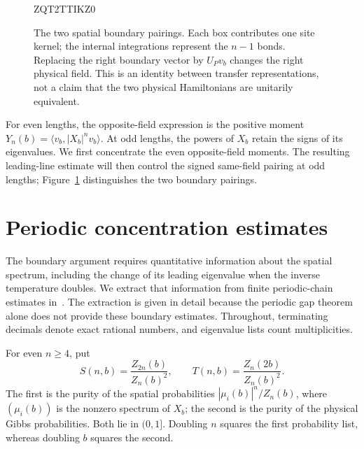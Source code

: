 \documentclass[11pt]{article}
\theoremstyle{remark}
\numberwithin{equation}{section}
\begin{document}
\begin{figure}[!htbp]

ZQT2TTIKZ0
\caption{The two spatial boundary pairings. Each box contributes one
site kernel; the internal integrations represent the $n-1$ bonds.
Replacing the right boundary vector by $U_Pv_b$ changes the right
physical field. This is an identity between transfer representations,
not a claim that the two physical Hamiltonians are unitarily equivalent.}
\label{fig:boundary-pairings}
\end{figure}

For even lengths, the opposite-field expression is the positive moment
$Y_n(b)=\langle v_b,|X_b|^n v_b\rangle$.
At odd lengths, the powers of $X_b$ retain the signs of its eigenvalues.
We first concentrate the even opposite-field moments. The resulting
leading-line estimate will then control the signed same-field pairing
at odd lengths; Figure~\ref{fig:boundary-pairings} distinguishes the
two boundary pairings.

\FloatBarrier
\section{Periodic concentration estimates}\label{sec:periodic}

The boundary argument requires quantitative information about the
spatial spectrum, including the change of its leading eigenvalue when
the inverse temperature doubles.  We extract that information from
finite periodic-chain estimates in~\cite{periodic}.  The extraction is
given in detail because the periodic gap theorem alone does not provide
these boundary estimates.  Throughout, terminating decimals denote
exact rational numbers, and eigenvalue lists count multiplicities.

For even $n\ge4$, put
\begin{equation}\label{per:purities}
 S(n,b)=\frac{Z_{2n}(b)}{Z_n(b)^2},\qquad
 T(n,b)=\frac{Z_n(2b)}{Z_n(b)^2}.
\end{equation}
The first is the purity of the spatial probabilities
$|\mu_i(b)|^n/Z_n(b)$, where $(\mu_i(b))$ is the nonzero spectrum of
$X_b$; the second is the purity of the physical Gibbs probabilities.
Both lie in $(0,1]$.  Doubling $n$ squares the first probability list,
whereas doubling $b$ squares the second.
\end{document}
